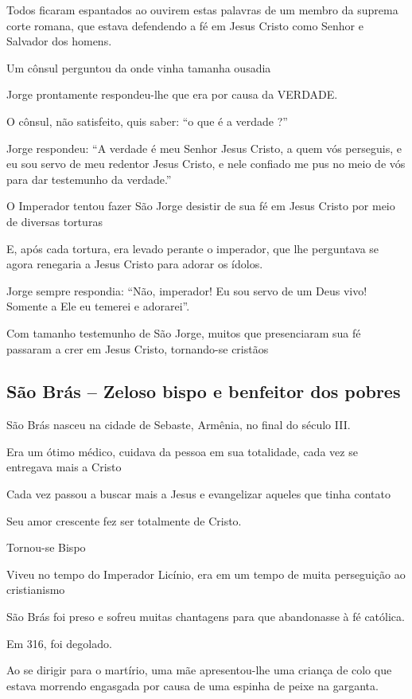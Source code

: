 \documentclass[a4paper,12pt]{extarticle} \usepackage[utf8]{inputenc}
\begin{document}
Todos ficaram espantados ao ouvirem estas palavras de um membro da suprema corte romana, que estava defendendo a fé em Jesus Cristo como Senhor e Salvador dos homens.

Um cônsul perguntou da onde vinha tamanha ousadia

Jorge prontamente respondeu-lhe que era por causa da VERDADE.

O cônsul, não satisfeito, quis saber: “o que é a verdade ?”

Jorge respondeu: “A verdade é meu Senhor Jesus Cristo, a quem vós perseguis, e eu sou servo de meu redentor Jesus Cristo, e nele confiado me pus no meio de vós para dar testemunho da verdade.”

O Imperador tentou fazer São Jorge desistir de sua fé em Jesus Cristo por meio de diversas torturas

E, após cada tortura, era levado perante o imperador, que lhe perguntava se agora renegaria a Jesus Cristo para adorar os ídolos.

Jorge sempre respondia: “Não, imperador! Eu sou servo de um Deus vivo! Somente a Ele eu temerei e adorarei”.

Com tamanho testemunho de São Jorge, muitos que presenciaram sua fé passaram a crer em Jesus Cristo, tornando-se cristãos


 
\subsection{São Brás – Zeloso bispo e benfeitor dos pobres}

São Brás nasceu na cidade de Sebaste, Armênia, no final do século III.

Era um ótimo médico, cuidava da pessoa em sua totalidade, cada vez se entregava mais a Cristo

Cada vez passou a buscar mais a Jesus e evangelizar aqueles que tinha contato

Seu amor crescente fez ser totalmente de Cristo.

Tornou-se Bispo

Viveu no tempo do Imperador Licínio, era em um tempo de muita perseguição ao cristianismo


São Brás foi preso e sofreu muitas chantagens para que abandonasse à fé católica.

Em 316, foi degolado.

Ao se dirigir para o martírio, uma mãe apresentou-lhe uma criança de colo que estava morrendo engasgada por causa de uma espinha de peixe na garganta.
\end{document}
